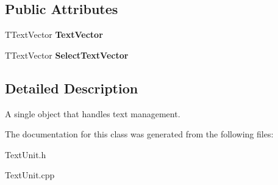 \subsection*{Public Attributes}
\begin{DoxyCompactItemize}
\item 
\mbox{\label{class_t_text_handler_a059b11907e0db9c7a847682a455b9cb9}} 
T\+Text\+Vector {\bfseries Text\+Vector}
\item 
\mbox{\label{class_t_text_handler_a5191f5daba7e3f1ea8f0ae82d8067211}} 
T\+Text\+Vector {\bfseries Select\+Text\+Vector}
\end{DoxyCompactItemize}


\subsection{Detailed Description}
A single object that handles text management. 

The documentation for this class was generated from the following files\+:\begin{DoxyCompactItemize}
\item 
Text\+Unit.\+h\item 
Text\+Unit.\+cpp\end{DoxyCompactItemize}
